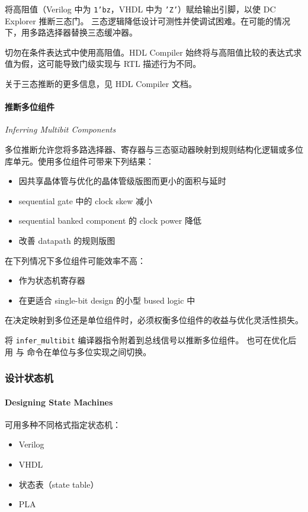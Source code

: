 将高阻值（Verilog 中为 \texttt{1'bz}，VHDL 中为 \texttt{'Z'}）赋给输出引脚，以使 DC Explorer 推断三态门。
三态逻辑降低设计可测性并使调试困难。在可能的情况下，用多路选择器替换三态缓冲器。

切勿在条件表达式中使用高阻值。HDL Compiler 始终将与高阻值比较的表达式求值为假，这可能导致门级实现与 RTL 描述行为不同。

关于三态推断的更多信息，见 HDL Compiler 文档。

\paragraph{推断多位组件}
\textit{Inferring Multibit Components}

多位推断允许您将多路选择器、寄存器与三态驱动器映射到规则结构化逻辑或多位库单元。使用多位组件可带来下列结果：
\begin{itemize}
  \item 因共享晶体管与优化的晶体管级版图而更小的面积与延时
  \item sequential gate 中的 clock skew 减小
  \item sequential banked component 的 clock power 降低
  \item 改善 datapath 的规则版图
\end{itemize}

在下列情况下多位组件可能效率不高：
\begin{itemize}
  \item 作为状态机寄存器
  \item 在更适合 single-bit design 的小型 bused logic 中
\end{itemize}

在决定映射到多位还是单位组件时，必须权衡多位组件的收益与优化灵活性损失。

将 \texttt{infer\_multibit} 编译器指令附着到总线信号以推断多位组件。
也可在优化后用  与  命令在单位与多位实现之间切换。

\subsubsection{设计状态机}
\paragraph*{Designing State Machines}

可用多种不同格式指定状态机：
\begin{itemize}
  \item Verilog
  \item VHDL
  \item 状态表（state table）
  \item PLA
\end{itemize}

